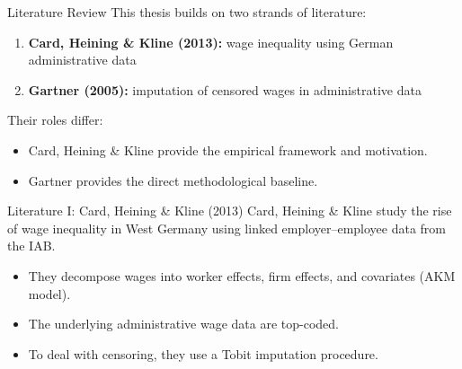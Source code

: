 \documentclass[10pt]{beamer}
\begin{document}
\begin{frame}{Literature Review}
This thesis builds on two strands of literature:
\begin{enumerate}
    \item \textbf{Card, Heining \& Kline (2013):} wage inequality using German administrative data
    \item \textbf{Gartner (2005):} imputation of censored wages in administrative data
\end{enumerate}

\vspace{0.3cm}
Their roles differ:
\begin{itemize}
    \item Card, Heining \& Kline provide the empirical framework and motivation.
    \item Gartner provides the direct methodological baseline.
\end{itemize}
\end{frame}

\begin{frame}{Literature I: Card, Heining \& Kline (2013)}
Card, Heining \& Kline study the rise of wage inequality in West Germany using linked employer--employee data from the IAB.

\vspace{0.3cm}
\begin{itemize}
    \item They decompose wages into worker effects, firm effects, and covariates (AKM model).
    \item The underlying administrative wage data are top-coded.
    \item To deal with censoring, they use a Tobit imputation procedure.
\end{itemize}

\end{frame}
\end{document}

